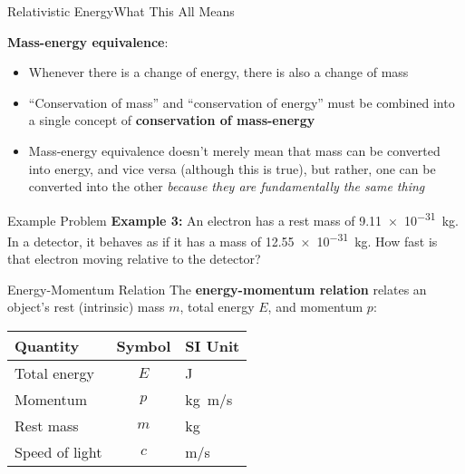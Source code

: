 \documentclass[12pt,compress,aspectratio=169]{beamer}
\newcommand{\eq}[2]{\vspace{#1}{\Large\begin{displaymath}#2\end{displaymath}}}
\begin{document}
\begin{frame}{Relativistic Energy}{What This All Means}
  
  \eq{-.2in}{
    \boxed{E=mc^2}
  }

  \textbf{Mass-energy equivalence}:
  \begin{itemize}
  \item Whenever there is a change of energy, there is also a change of mass
  \item ``Conservation of mass'' and ``conservation of energy'' must be
    combined into a single concept of \textbf{conservation of mass-energy}
  \item Mass-energy equivalence doesn't merely mean that mass can be converted
    into energy, and vice versa (although this is true), but rather, one can be
    converted into the other
    \emph{because they are fundamentally the same thing}
  \end{itemize}
\end{frame}



\begin{frame}{Example Problem}
  \textbf{Example 3:} An electron has a rest mass of \SI{9.11e-31}{\kilo\gram}.
  In a detector, it behaves as if it has a mass of \SI{12.55e-31}{\kilo\gram}.
  How fast is that electron moving relative to the detector?
\end{frame}



\begin{frame}{Energy-Momentum Relation}
  The \textbf{energy-momentum relation} relates an object's rest (intrinsic)
  mass $m$, total energy $E$, and momentum $p$:

  \eq{-.2in}{
    \boxed{E^2=p^2c^2+m^2c^4}
  }
  \begin{center}
    \begin{tabular}{l|c|l}
      \rowcolor{pink}
      \textbf{Quantity} & \textbf{Symbol} & \textbf{SI Unit} \\ \hline
      Total energy   & $E$ & \si{\joule} \\
      Momentum       & $p$ & \si{\kilo\gram.\metre/\second}\\
      Rest mass      & $m$ & \si{\kilo\gram} \\
      Speed of light & $c$ & \si{\metre/\second}
    \end{tabular}
  \end{center}
\end{frame}
\end{document}
